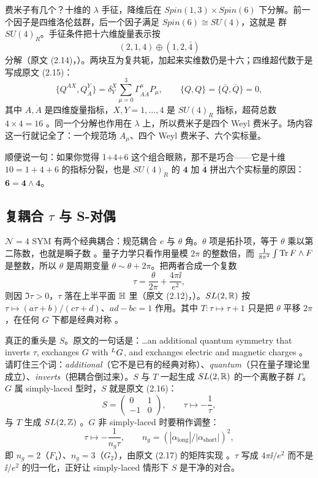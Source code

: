 费米子有几个？十维的 $\lambda$ 手征，降维后在 $Spin(1,3)\times Spin(6)$ 下分解。前一个因子是四维洛伦兹群，后一个因子满足 $Spin(6)\cong SU(4)$，这就是  群 $SU(4)_R$。手征条件把十六维旋量表示按
\[
(2,1,4)\oplus(1,2,\bar 4)
\]
分解（原文 (2.14)，）。两块互为复共轭，加起来实维数仍是十六；四维超代数于是写成原文 (2.15)：
\[
\{Q^{AX},Q^Y_{\dot A}\}=\delta^X_Y\sum_{\mu=0}^{3}\Gamma^\mu_{A\dot A}P_\mu,
\qquad \{Q,Q\}=\{\bar Q,\bar Q\}=0,
\]
其中 $A,\dot A$ 是四维旋量指标，$X,Y=1,\dots,4$ 是 $SU(4)_R$ 指标，超荷总数 $4\times 4=16$ 。同一个分解也作用在 $\lambda$ 上，所以费米子是四个 Weyl 费米子。场内容这一行就记全了：一个规范场 $A_\mu$、四个 Weyl 费米子、六个实标量。

顺便说一句：如果你觉得 1+4+6 这个组合眼熟，那不是巧合——它是十维 $10=1+4+6$ 的指标分裂，也是 $SU(4)_R$ 的 $\mathbf 4$ 加 $\bar{\mathbf 4}$ 拼出六个实标量的原因：$\mathbf 6=\mathbf 4\wedge\mathbf 4$。

\subsection{复耦合 $\tau$ 与 S-对偶}

$\mathcal N=4$ SYM 有两个经典耦合：规范耦合 $e$ 与 $\theta$ 角。$\theta$ 项是拓扑项，等于 $\theta$ 乘以第二陈数，也就是瞬子数 。量子力学只看作用量模 $2\pi$ 的整数倍，而 $\frac{1}{8\pi^2}\int\operatorname{Tr} F\wedge F$ 是整数，所以 $\theta$ 是周期变量 $\theta\sim\theta+2\pi$。把两者合成一个复数
\[
\tau=\frac{\theta}{2\pi}+\frac{4\pi\ii}{e^2},
\]
则因 $\Im\tau>0$，$\tau$ 落在上半平面 $\mathbb{H}$ 里（原文 (2.12)，）。$SL(2,\mathbb{R})$ 按 $\tau\mapsto(a\tau+b)/(c\tau+d)$、$ad-bc=1$ 作用。其中 $T:\tau\mapsto\tau+1$ 只是把 $\theta$ 平移 $2\pi$，在任何 $G$ 下都是经典对称 。

真正的重头是 $S$。原文的一句话是：\ldots an additional quantum symmetry that inverts $\tau$, exchanges $G$ with ${}^{L}G$, and exchanges electric and magnetic charges 。请盯住三个词：\emph{additional}（它不是已有的经典对称）、\emph{quantum}（只在量子理论里成立）、\emph{inverts}（把耦合倒过来）。$S$ 与 $T$ 一起生成 $SL(2,\mathbb{R})$ 的一个离散子群 $\Gamma$。$G$ 属 simply-laced 型时，$S$ 就是原文 (2.16)：
\[
S=\begin{pmatrix}0&1\\-1&0\end{pmatrix},\qquad
\tau\mapsto-\frac{1}{\tau},
\]
与 $T$ 生成 $SL(2,\mathbb{Z})$ 。$G$ 非 simply-laced 时要稍作调整：
\[
\tau\mapsto-\frac{1}{n_g\tau},\qquad
n_g=(|\alpha_{\mathrm{long}}|/|\alpha_{\mathrm{short}}|)^2 ,
\]
即 $n_g=2$（$F_4$）、$n_g=3$（$G_2$），由原文 (2.17) 的矩阵实现 。$\tau$ 写成 $4\pi\ii/e^2$ 而不是 $\ii/e^2$ 的归一化，正好让 simply-laced 情形下 $S$ 是干净的对合。

